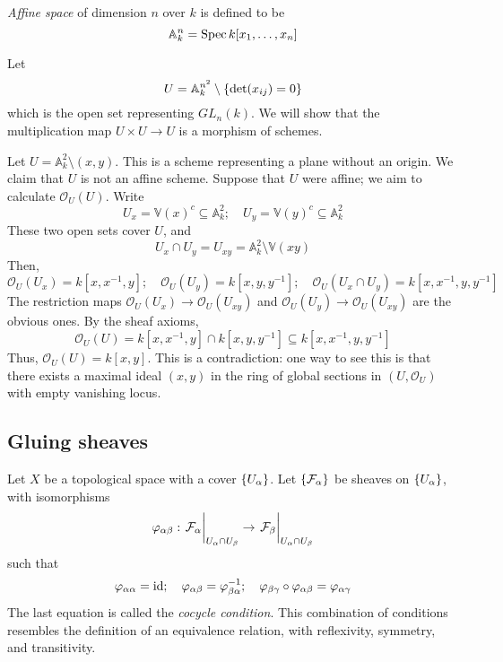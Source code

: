 \begin{definition}
    \emph{Affine space} of dimension \( n \) over \( k \) is defined to be
    \[ \mathbb A_k^n = \operatorname{Spec} k[x_1, \dots, x_n] \]
\end{definition}
\begin{example}
    Let
    \[ U = \mathbb A_k^{n^2} \setminus \qty{\det (x_{ij}) = 0} \]
    which is the open set representing \( GL_n(k) \).
    We will show that the multiplication map \( U \times U \to U \) is a morphism of schemes.
\end{example}
\begin{example}
    Let \( U = \mathbb A_k^2 \setminus (x, y) \).
    This is a scheme representing a plane without an origin.
    We claim that \( U \) is not an affine scheme.
    Suppose that \( U \) were affine; we aim to calculate \( \mathcal O_U(U) \).
    Write
    \[ U_x = \mathbb V(x)^c \subseteq \mathbb A_k^2;\quad U_y = \mathbb V(y)^c \subseteq \mathbb A_k^2 \]
    These two open sets cover \( U \), and
    \[ U_x \cap U_y = U_{xy} = \mathbb A_k^2 \setminus \mathbb V(xy) \]
    Then,
    \[ \mathcal O_U(U_x) = k[x,x^{-1},y];\quad \mathcal O_U(U_y) = k[x,y,y^{-1}];\quad \mathcal O_U(U_x \cap U_y) = k[x,x^{-1},y,y^{-1}] \]
    The restriction maps \( \mathcal O_U(U_x) \to \mathcal O_U(U_{xy}) \) and \( \mathcal O_U(U_y) \to \mathcal O_U(U_{xy}) \) are the obvious ones.
    By the sheaf axioms,
    \[ \mathcal O_U(U) = k[x,x^{-1},y] \cap k[x,y,y^{-1}] \subseteq k[x,x^{-1},y,y^{-1}] \]
    Thus, \( \mathcal O_U(U) = k[x,y] \).
    This is a contradiction: one way to see this is that there exists a maximal ideal \( (x, y) \) in the ring of global sections in \( (U, \mathcal O_U) \) with empty vanishing locus.
\end{example}

\subsection{Gluing sheaves}
Let \( X \) be a topological space with a cover \( \qty{U_\alpha} \).
Let \( \qty{\mathcal F_\alpha} \) be sheaves on \( \qty{U_\alpha} \), with isomorphisms
\[ \varphi_{\alpha\beta} : \eval{\mathcal F_\alpha}_{U_\alpha \cap U_\beta} \to \eval{\mathcal F_\beta}_{U_\alpha \cap U_\beta} \]
such that
\[ \varphi_{\alpha\alpha} = \operatorname{id};\quad \varphi_{\alpha\beta} = \varphi_{\beta\alpha}^{-1};\quad \varphi_{\beta\gamma} \circ \varphi_{\alpha\beta} = \varphi_{\alpha\gamma} \]
The last equation is called the \emph{cocycle condition}.
This combination of conditions resembles the definition of an equivalence relation, with reflexivity, symmetry, and transitivity.

